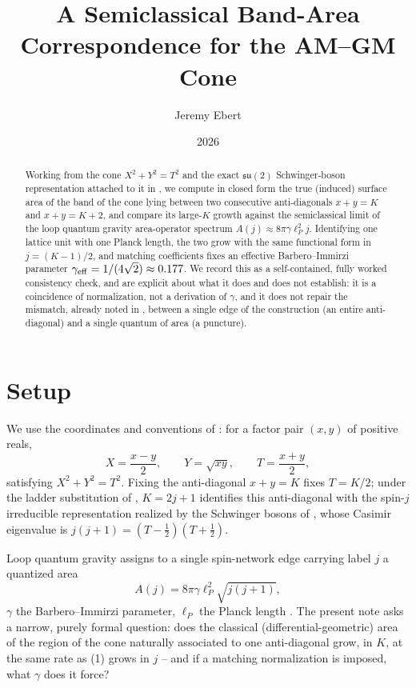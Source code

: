\documentclass[11pt]{amsart}
\title{A Semiclassical Band-Area Correspondence for the AM--GM Cone}
\author{Jeremy Ebert}
\date{2026}
\theoremstyle{remark}
\begin{document}
\maketitle

\begin{abstract}
Working from the cone $X^2+Y^2=T^2$ and the exact $\mathfrak{su}(2)$ Schwinger-boson
representation attached to it in \cite{Ebert2026}, we compute in closed form the
true (induced) surface area of the band of the cone lying between two consecutive
anti-diagonals $x+y=K$ and $x+y=K+2$, and compare its large-$K$ growth against the
semiclassical limit of the loop quantum gravity area-operator spectrum
$A(j)\approx 8\pi\gamma\ell_P^2 j$. Identifying one lattice unit with one Planck
length, the two grow with the same functional form in $j=(K-1)/2$, and matching
coefficients fixes an effective Barbero--Immirzi parameter $\gamma_{\rm eff}=1/(4\sqrt2)\approx0.177$.
We record this as a self-contained, fully worked consistency check, and are explicit
about what it does and does not establish: it is a coincidence of normalization, not a
derivation of $\gamma$, and it does not repair the mismatch, already noted in
\cite{Ebert2026}, between a single edge of the construction (an entire anti-diagonal)
and a single quantum of area (a puncture).
\end{abstract}

\section{Setup}

We use the coordinates and conventions of \cite{Ebert2026}: for a factor pair
$(x,y)$ of positive reals,
\[
X=\frac{x-y}2,\qquad Y=\sqrt{xy},\qquad T=\frac{x+y}2,
\]
satisfying $X^2+Y^2=T^2$. Fixing the anti-diagonal $x+y=K$ fixes $T=K/2$; under the
ladder substitution of \cite[\S5.1]{Ebert2026}, $K=2j+1$ identifies this anti-diagonal
with the spin-$j$ irreducible representation realized by the Schwinger bosons of
\cite[\S5.2]{Ebert2026}, whose Casimir eigenvalue is $j(j+1)=(T-\tfrac12)(T+\tfrac12)$.

Loop quantum gravity assigns to a single spin-network edge carrying label $j$ a
quantized area
\begin{equation}
A(j) = 8\pi\gamma\ell_P^2\sqrt{j(j+1)}, \tag{1}
\end{equation}
$\gamma$ the Barbero--Immirzi parameter, $\ell_P$ the Planck length \cite{Rovelli2004}.
The present note asks a narrow, purely formal question: does the classical
(differential-geometric) area of the region of the cone naturally associated to one
anti-diagonal grow, in $K$, at the same rate as (1) grows in $j$ -- and if a matching
normalization is imposed, what $\gamma$ does it force?
\end{document}
